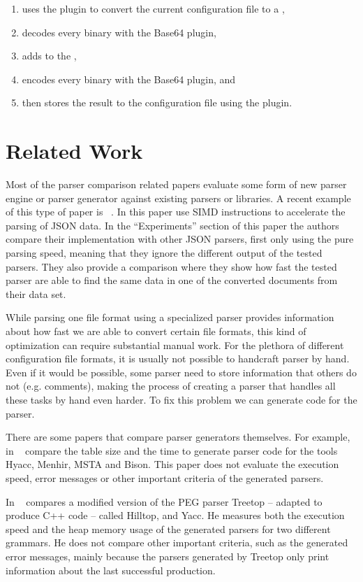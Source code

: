 \begin{enumerate}
  \item uses the  plugin to convert the current  configuration file to a ,
  \item decodes every binary  with the Base64 plugin,
  \item adds  to the ,
  \item encodes every binary  with the Base64 plugin, and
  \item then stores the result to the configuration file using the  plugin.
\end{enumerate}

\section{Related Work}

Most of the parser comparison related papers evaluate some form of new parser engine or parser generator against existing parsers or libraries. A recent example of this type of paper is ~\cite{json2019geoff}. In this paper \citeauthor{json2019geoff} use \gls{SIMD} instructions to accelerate the parsing of \gls{JSON} data. In the “Experiments” section of this paper the authors compare their implementation with other JSON parsers, first only using the pure parsing speed, meaning that they ignore the different output of the tested parsers. They also provide a comparison where they show how fast the tested parser are able to find the same data in one of the converted documents from their data set.

While parsing one file format using a specialized parser provides information about how fast we are able to convert certain file formats, this kind of optimization can require substantial manual work. For the plethora of different configuration file formats, it is usually not possible to handcraft parser by hand. Even if it would be possible, some parser need to store information that others do not (e.g. comments), making the process of creating a parser that handles all these tasks by hand even harder. To fix this problem we can generate code for the parser.

There are some papers that compare parser generators themselves. For example, in ~\cite{chen2011full} \citeauthor{chen2011full} compare the table size and the time to generate parser code for the tools Hyacc, Menhir, MSTA and Bison. This paper does not evaluate the execution speed, error messages or other important criteria of the generated parsers.

In ~\cite{flodin2014packrat} \citeauthor{flodin2014packrat} compares a modified version of the PEG parser Treetop – adapted to produce C++ code – called Hilltop, and \gls{Yacc}. He measures both the execution speed and the heap memory usage of the generated parsers for two different grammars. He does not compare other important criteria, such as the generated error messages, mainly because the parsers generated by Treetop only print information about the last successful production.
